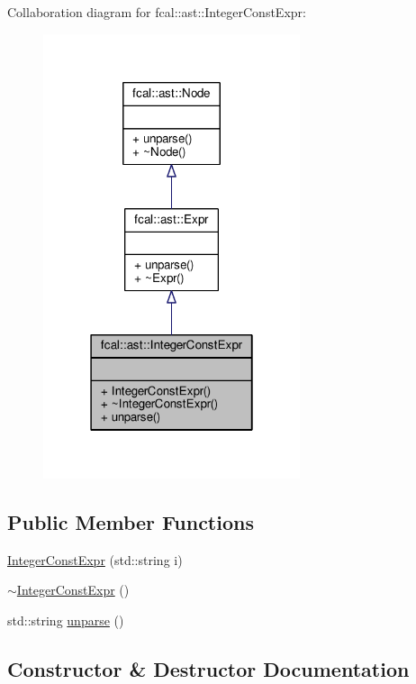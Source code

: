 Collaboration diagram for fcal\+:\+:ast\+:\+:Integer\+Const\+Expr\+:
\nopagebreak
\begin{figure}[H]
\begin{center}
\leavevmode
\includegraphics[width=214pt]{classfcal_1_1ast_1_1IntegerConstExpr__coll__graph}
\end{center}
\end{figure}
\subsection*{Public Member Functions}
\begin{DoxyCompactItemize}
\item 
\hyperlink{classfcal_1_1ast_1_1IntegerConstExpr_a91327bb29876851e171ae1d8579de88f}{Integer\+Const\+Expr} (std\+::string i)
\item 
\hyperlink{classfcal_1_1ast_1_1IntegerConstExpr_a1aa3a4a6f88a68af7f8acf126f766369}{$\sim$\+Integer\+Const\+Expr} ()
\item 
std\+::string \hyperlink{classfcal_1_1ast_1_1IntegerConstExpr_afccb833ff588cd49929358ab76cafdc4}{unparse} ()
\end{DoxyCompactItemize}


\subsection{Constructor \& Destructor Documentation}

